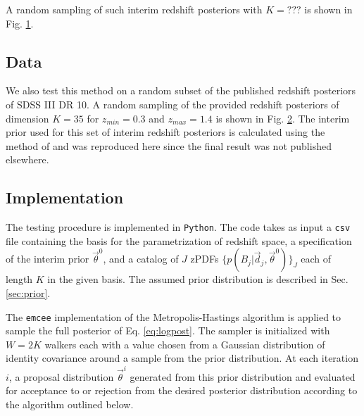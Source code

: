 \documentclass[preprint]{aastex}
\begin{document}
A random sampling of such interim redshift posteriors with $K=???$ is shown in 
Fig. \ref{fig:nullpzs}.

\begin{figure}
\caption{}
\label{fig:nullpzs}
\end{figure}

\clearpage
\subsection{Data}
\label{sec:data}

We also test this method on a random subset of the published redshift 
posteriors of SDSS III DR 10.  A random sampling of the provided redshift 
posteriors of dimension $K=35$ for $z_{min}=0.3$ and $z_{max}=1.4$ is shown in 
Fig. \ref{fig:datapzs}.  The interim prior used for this set of interim 
redshift posteriors is calculated using the method of \citet{she11} and was 
reproduced here since the final result was not published elsewhere.

\begin{figure}
\caption{}
\label{fig:datapzs}
\end{figure}

\clearpage
\subsection{Implementation}
\label{sec:mcmc}

The testing procedure is implemented in \texttt{Python}.  The code takes as 
input a \texttt{csv} file containing the basis for the parametrization of 
redshift space, a specification of the interim prior $\vec{\theta}^{0}$, and a 
catalog of $J$ zPDFs $\{p(B_{j}|\vec{d}_{j},\vec{\theta}^{0})\}_{J}$ each of 
length $K$ in the given basis.  The assumed prior distribution is described in 
Sec. \ref{sec:prior}.

The \texttt{emcee} implementation of the Metropolis-Hastings algorithm is 
applied to sample the full posterior of Eq. \ref{eq:logpost}.   \citep{for12}   
The sampler is initialized with $W=2K$ walkers each with a value chosen from a 
Gaussian distribution of identity covariance around a sample from the prior 
distribution.  At each iteration $i$, a proposal distribution 
$\vec{\theta}^{i}$ generated from this prior distribution and evaluated for 
acceptance to or rejection from the desired posterior distribution according to 
the algorithm outlined below.  
\end{document}
